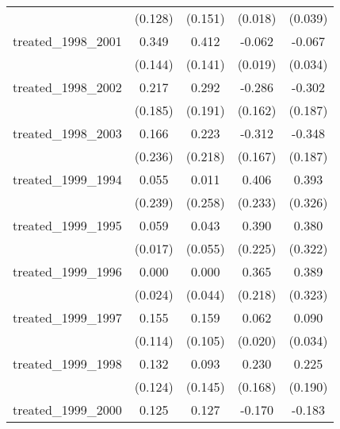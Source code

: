 {\begin{tabular}{l*{4}{c}}
            &     (0.128)         &     (0.151)         &     (0.018)         &     (0.039)         \\
[1em]
treated\_1998\_2001&       0.349\sym{*}  &       0.412\sym{**} &      -0.062\sym{**} &      -0.067         \\
            &     (0.144)         &     (0.141)         &     (0.019)         &     (0.034)         \\
[1em]
treated\_1998\_2002&       0.217         &       0.292         &      -0.286         &      -0.302         \\
            &     (0.185)         &     (0.191)         &     (0.162)         &     (0.187)         \\
[1em]
treated\_1998\_2003&       0.166         &       0.223         &      -0.312         &      -0.348         \\
            &     (0.236)         &     (0.218)         &     (0.167)         &     (0.187)         \\
[1em]
treated\_1999\_1994&       0.055         &       0.011         &       0.406         &       0.393         \\
            &     (0.239)         &     (0.258)         &     (0.233)         &     (0.326)         \\
[1em]
treated\_1999\_1995&       0.059\sym{***}&       0.043         &       0.390         &       0.380         \\
            &     (0.017)         &     (0.055)         &     (0.225)         &     (0.322)         \\
[1em]
treated\_1999\_1996&       0.000         &       0.000         &       0.365         &       0.389         \\
            &     (0.024)         &     (0.044)         &     (0.218)         &     (0.323)         \\
[1em]
treated\_1999\_1997&       0.155         &       0.159         &       0.062\sym{**} &       0.090\sym{**} \\
            &     (0.114)         &     (0.105)         &     (0.020)         &     (0.034)         \\
[1em]
treated\_1999\_1998&       0.132         &       0.093         &       0.230         &       0.225         \\
            &     (0.124)         &     (0.145)         &     (0.168)         &     (0.190)         \\
[1em]
treated\_1999\_2000&       0.125         &       0.127         &      -0.170         &      -0.183         \\

\end{tabular}}
